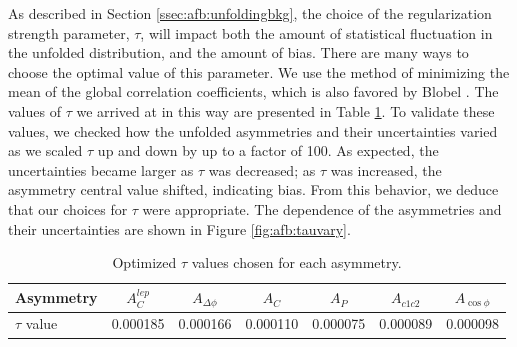 As described in Section \ref{ssec:afb:unfoldingbkg}, the choice of the
regularization strength parameter, $\tau$, will impact both the amount of statistical
fluctuation in the unfolded distribution, and the amount of
bias. There are many ways to choose the optimal value of this parameter. We
use the method of minimizing the mean of the global correlation
coefficients, which is also favored by Blobel
\cite{blobelseminar}. The values of $\tau$ we arrived at in this way
are presented in Table \ref{tab:afb:tau1d}. To validate these values,
we checked how the unfolded asymmetries and their uncertainties varied as we scaled
$\tau$ up and down by up to a factor of 100. As expected, the
uncertainties became larger as $\tau$ was decreased; as $\tau$ was
increased, the asymmetry central value shifted, indicating bias. From
this behavior, we deduce that our choices for $\tau$ were
appropriate. The dependence of the asymmetries and their uncertainties
are shown in Figure \ref{fig:afb:tauvary}.

\begin{table}[htb]
\begin{center}
\caption{Optimized $\tau$ values chosen for each asymmetry.}
\label{tab:afb:tau1d}
\begin{tabular}{l | c  c  c  c  c  c }
\hline
Asymmetry & $A^{lep}_{C}$ & $A_{\Delta\phi}$ & $A_{C}$ & $A_{P}$ & $A_{c1c2}$ & $A_{\cos\phi}$ \\ \hline
$\tau$ value & 0.000185 & 0.000166 & 0.000110 & 0.000075 & 0.000089 & 0.000098 \\ \hline
\end{tabular}
\end{center}
\end{table}

